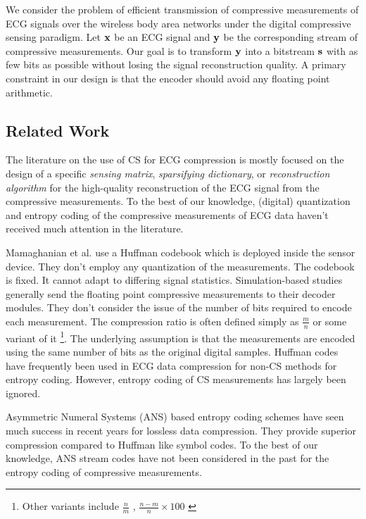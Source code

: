 We consider the problem of efficient transmission of
compressive measurements of ECG signals over the wireless body
area networks under the digital compressive sensing paradigm.
Let $\mathbf{x}$ be an ECG signal and $\mathbf{y}$ be the corresponding
stream of compressive measurements. Our goal is to
transform $\mathbf{y}$ into a bitstream $\mathbf{s}$ with as few bits
as possible without losing the signal reconstruction quality.
A primary constraint in our design is that the encoder
should avoid any floating point arithmetic.


\subsection{Related Work}

The literature on the use of CS for ECG compression is mostly
focused on the design of a specific \emph{sensing matrix},
\emph{sparsifying dictionary}, or \emph{reconstruction algorithm}
for the high-quality reconstruction of the ECG signal from the
compressive measurements.
To the best of our knowledge, (digital) quantization and entropy coding of
the compressive measurements of ECG data haven't received much attention
in the literature.

Mamaghanian et al.\cite{mamaghanian2011compressed} use a Huffman codebook
which is deployed inside the sensor device. They don't
employ any quantization of the measurements.
The codebook is fixed. It cannot adapt to differing signal
statistics.
Simulation-based studies generally send the floating point compressive
measurements to their decoder modules.
They don't consider the issue of
the number of bits required to encode each measurement.
The compression ratio is often defined simply as $\frac{m}{n}$
or some variant of it
\footnote{Other variants include
$\frac{n}{m}$ \cite{zhang2012compressed},
$\frac{n-m}{n} \times 100$ \cite{zhang2021csnet}}.
The underlying assumption is that the measurements are
encoded using the same number of bits as the original digital samples.
Huffman codes have frequently been used in ECG data
compression for non-CS methods \cite{luo2014dynamic,chouakri2013wavelet}
for entropy coding.
However, entropy coding of CS measurements has largely been ignored.

Asymmetric Numeral Systems (ANS) \cite{duda2013asymmetric}
based entropy coding schemes have seen much success
in recent years for lossless data compression.
They provide superior compression compared to Huffman
like symbol codes.
To the best of our knowledge, ANS stream codes
have not been considered in the past for the entropy
coding of compressive measurements.


